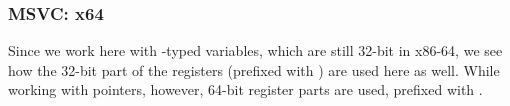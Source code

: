 \subsubsection{MSVC: x64}


Since we work here with \Tint{}-typed variables, which are still 32-bit in x86-64, we see how the 32-bit part of the registers (prefixed with ) are used here as well.
While working with pointers, however, 64-bit register parts are used, prefixed with .



